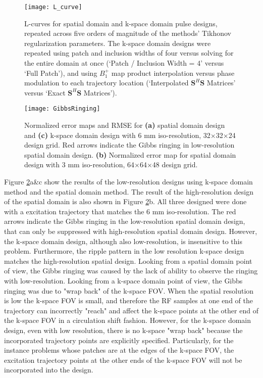 \begin{figure}
	\centering
	\texttt{[image: L\_curve]}
	\caption{L-curves for spatial domain and k-space domain pulse designs, 
	repeated across five orders of magnitude of the methods' Tikhonov regularization parameters.
	The k-space domain designs were repeated using patch and inclusion widths of four versus solving for the entire domain at once (`Patch / Inclusion Width = 4' versus `Full Patch'),
	and using $B_1^+$ map product interpolation versus phase modulation to each trajectory location (`Interpolated $\bm{S}^H\bm{S}$ Matrices' versus
	`Exact $\bm{S}^H\bm{S}$ Matrices').}
	\label{fig:LCurves}
\end{figure}



\begin{figure}
	\centering
	\texttt{[image: GibbsRinging]}
	\caption{Normalized error maps and RMSE for \textbf{(a)} spatial domain design and \textbf{(c)} k-space domain design with 6 mm iso-resolution, 32$\times$32$\times$24 design grid. Red arrows indicate the Gibbs ringing in low-resolution spatial domain design. \textbf{(b)} Normalized error map for spatial domain design with 3 mm iso-resolution, 64$\times$64$\times$48 design grid.}
	\label{fig:GibbsRing}
\end{figure}

Figure \ref{fig:GibbsRing}a\&c show the results of the  low-resolution designs using k-space domain method and the spatial domain method. The result of the high-resolution design of the spatial domain is also shown in Figure \ref{fig:GibbsRing}b. All three designed were done with a excitation trajectory that matches the 6 mm iso-resolution. The red arrows indicate the Gibbs ringing in the low-resolution spatial domain design, that can only be suppressed with high-resolution spatial domain design. However, the k-space domain design, although also low-resolution, is insensitive to this problem. Furthermore, the ripple pattern in the low resolution k-space design matches the high-resolution spatial design. Looking from a spatial domain point of view, the Gibbs ringing was caused by the lack of ability to observe the ringing with low-resolution. Looking from a k-space domain point of view, the Gibbs ringing was due to "wrap back" of the k-space FOV. When the spatial resolution is low the k-space FOV is small, and therefore the RF samples at one end of the trajectory can incorrectly "reach" and affect the k-space points at the other end of the k-space FOV in a circulation shift fashion. However, for the k-space domain design, even with low resolution, there is no k-space "wrap back" because the incorporated trajectory points are explicitly specified. Particularly, for the instance problems whose patches are at the edges of the k-space FOV, the excitation trajectory points at the other ends of the k-space FOV will not be incorporated into the design.    


